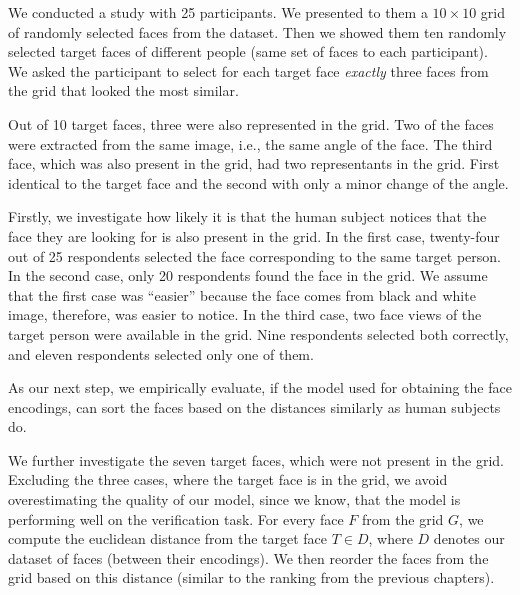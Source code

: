 We conducted a study with 25 participants. We presented to them a $10\times10$ grid of randomly selected faces from the dataset. 
Then we showed them ten randomly selected target faces of different people (same set of faces to each participant). We asked the participant to select for each target face \emph{exactly} three faces from the grid that looked the most similar. 


Out of 10 target faces, three were also represented in the grid. Two of the faces were extracted from the same image, i.e., the same angle of the face. The third face, which was also present in the grid, had two representants in the grid. First identical to the target face and the second with only a minor change of the angle.

Firstly, we investigate how likely it is that the human subject notices that the face they are looking for is also present in the grid. In the first case, twenty-four out of 25 respondents selected the face corresponding to the same target person. In the second case, only 20 respondents found the face in the grid. We assume that the first case was ``easier'' because the face comes from black and white image, therefore, was easier to notice. In the third case, two face views of the target person were available in the grid. Nine respondents selected both correctly, and eleven respondents selected only one of them. 

As our next step, we empirically evaluate, if the model used for obtaining the face encodings, can sort the faces based on the distances similarly as human subjects do.

We further investigate the seven target faces, which were not present in the grid. Excluding the three cases, where the target face is in the grid, we avoid overestimating the quality of our model, since we know, that the model is performing well on the verification task. For every face $F$ from the grid $G$, we compute the euclidean distance from the target face $T\in D$, where $D$ denotes our dataset of faces (between their encodings). We then reorder the faces from the grid based on this distance (similar to the ranking from the previous chapters). 

